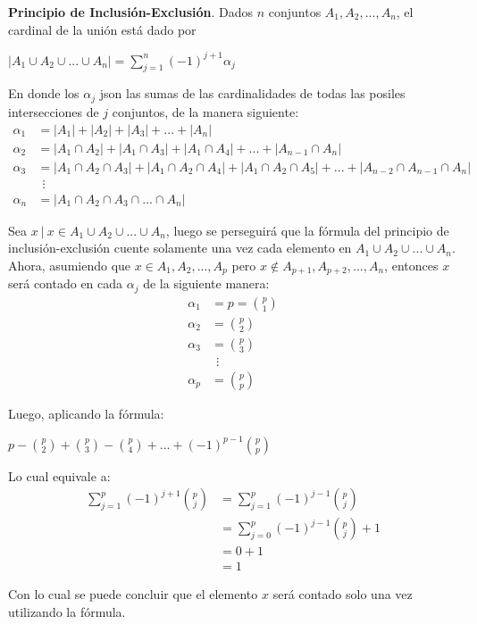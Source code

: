 \documentclass[12pt]{article}
\begin{document}
\begin{teorema}
    \textbf{Principio de Inclusión-Exclusión}. Dados $n$ conjuntos $A_1, A_2, ..., A_n$, el cardinal de la unión está dado por

    \begin{center}
        $|A_1 \cup A_2 \cup ... \cup A_n| = \displaystyle\sum_{j=1}^{n} (-1)^{j+1} \alpha_j$
    \end{center}
    
    En donde los $\alpha_j$ json las sumas de las cardinalidades de todas las posiles intersecciones de $j$ conjuntos, de la manera siguiente:
    \begin{align*}
        \alpha_1 & = |A_1| + |A_2| + |A_3| + ... + |A_n| \\
        \alpha_2 & = |A_1 \cap A_2| + |A_1 \cap A_3| + |A_1 \cap A_4| + ... + |A_{n-1} \cap A_n| \\
        \alpha_3 & = |A_1 \cap A_2 \cap A_3| + |A_1 \cap A_2 \cap A_4| + |A_1 \cap A_2 \cap A_5| + ... + |A_{n-2} \cap A_{n-1} \cap A_n| \\
        & \ \ \vdots \\
        \alpha_n & = |A_1 \cap A_2 \cap A_3 \cap ... \cap A_n|
    \end{align*}

\end{teorema}

\begin{demostracion}
    Sea $x \ | \ x \in A_1 \cup A_2 \cup ... \cup A_n$, luego se perseguirá que la fórmula del principio de inclusión-exclusión cuente solamente una vez cada elemento en $A_1 \cup A_2 \cup ... \cup A_n$. Ahora, asumiendo que $x \in A_1,A_2,...,A_p$ pero $x \notin A_{p+1},A_{p+2},...,A_n$, entonces $x$ será contado en cada $\alpha_j$ de la siguiente manera:
    \begin{align*}
        \alpha_1 & = p = \binom{p}{1}  \\
        \alpha_2 & = \binom{p}{2} \\
        \alpha_3 & = \binom{p}{3} \\
        & \ \ \vdots \\
        \alpha_p & = \binom{p}{p}
    \end{align*}

    Luego, aplicando la fórmula:

    \begin{center}
        $p-\binom{p}{2}+\binom{p}{3}-\binom{p}{4}+ ... + (-1)^{p-1} \binom{p}{p}$
    \end{center}

    Lo cual equivale a:
    \begin{align*}
        \displaystyle\sum_{j=1}^{p} (-1)^{j+1} \binom{p}{j} & = \displaystyle\sum_{j=1}^{p} (-1)^{j-1} \binom{p}{j} \\
        & = \displaystyle\sum_{j=0}^{p} (-1)^{j-1} \binom{p}{j} + 1 \\
        & = 0 + 1 \\
        & = 1
    \end{align*}

    Con lo cual se puede concluir que el elemento $x$ será contado solo una vez utilizando la fórmula.
\end{demostracion}
\end{document}
